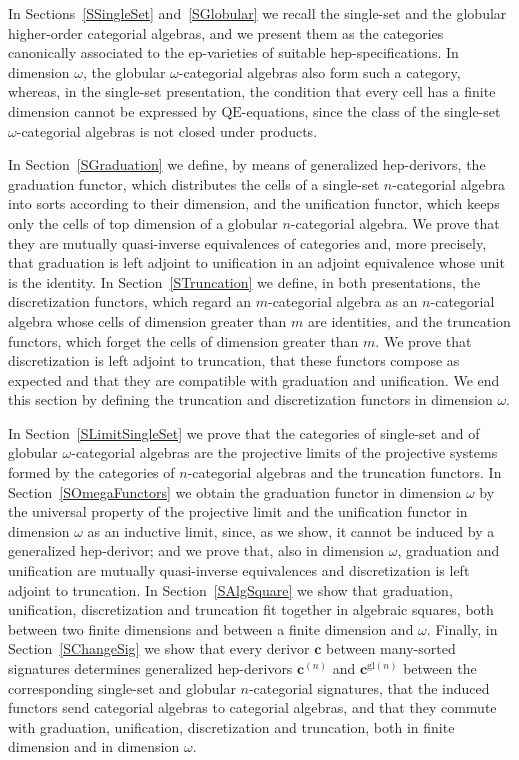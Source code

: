 \documentclass[a4paper, reqno
]{amsart}
\newcommand{\QE}{\mathrm{QE}}
\newcommand{\gl}{\mathrm{gl}}                %
\theoremstyle{plain}
\theoremstyle{definition}
\begin{document}
In Sections~\ref{SSingleSet} and~\ref{SGlobular} we recall the single-set and the globular higher-order categorial algebras, and we present them as the categories canonically associated to the ep-varieties of suitable hep-specifications.
In dimension $\omega$, the globular $\omega$-categorial algebras also form such a category, whereas, in the single-set presentation, the condition that every cell has a finite dimension cannot be expressed by $\QE$-equations, since the class of the single-set $\omega$-categorial algebras is not closed under products.

In Section~\ref{SGraduation} we define, by means of generalized hep-derivors, the graduation functor, which distributes the cells of a single-set $n$-categorial algebra into sorts according to their dimension, and the unification functor, which keeps only the cells of top dimension of a globular $n$-categorial algebra.
We prove that they are mutually quasi-inverse equivalences of categories and, more precisely, that graduation is left adjoint to unification in an adjoint equivalence whose unit is the identity.
In Section~\ref{STruncation} we define, in both presentations, the discretization functors, which regard an $m$-categorial algebra as an $n$-categorial algebra whose cells of dimension greater than $m$ are identities, and the truncation functors, which forget the cells of dimension greater than $m$.
We prove that discretization is left adjoint to truncation, that these functors compose as expected and that they are compatible with graduation and unification.
We end this section by defining the truncation and discretization functors in dimension $\omega$.

In Section~\ref{SLimitSingleSet} we prove that the categories of single-set and of globular $\omega$-categorial algebras are the projective limits of the projective systems formed by the categories of $n$-categorial algebras and the truncation functors.
In Section~\ref{SOmegaFunctors} we obtain the graduation functor in dimension $\omega$ by the universal property of the projective limit and the unification functor in dimension $\omega$ as an inductive limit, since, as we show, it cannot be induced by a generalized hep-derivor; and we prove that, also in dimension $\omega$, graduation and unification are mutually quasi-inverse equivalences and discretization is left adjoint to truncation.
In Section~\ref{SAlgSquare} we show that graduation, unification, discretization and truncation fit together in algebraic squares, both between two finite dimensions and between a finite dimension and $\omega$.
Finally, in Section~\ref{SChangeSig} we show that every derivor $\mathbf{c}$ between many-sorted signatures determines generalized hep-derivors $\mathbf{c}^{(n)}$ and $\mathbf{c}^{\gl(n)}$ between the corresponding single-set and globular $n$-categorial signatures, that the induced functors send categorial algebras to categorial algebras, and that they commute with graduation, unification, discretization and truncation, both in finite dimension and in dimension $\omega$.
\end{document}
